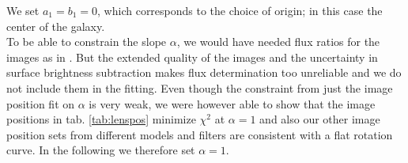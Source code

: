 We set $a_1 = b_1 = 0$, which corresponds to the choice of origin; in this case the center of the galaxy.
\\To be able to constrain the slope $\alpha$, we would have needed flux ratios for the images as in \citet{GlennEC}. But the extended quality of the images and the uncertainty in surface brightness subtraction makes flux determination too unreliable and we do not include them in the fitting. Even though the constraint from just the image position fit on $\alpha$ is very weak, we were however able to show that the image positions in tab. \ref{tab:lenspos} minimize $\chi^2$ at $\alpha=1$ and also our other image position sets from different models and filters are consistent with a flat rotation curve. In the following we therefore set $\alpha=1$.